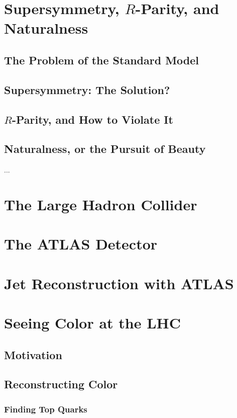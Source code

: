 \documentclass{report}
\begin{document}
\chapter{Supersymmetry, $R$-Parity, and Naturalness}
\section{The Problem of the Standard Model}
\section{Supersymmetry: The Solution?}
\section{$R$-Parity, and How to Violate It}
\section{Naturalness, or the Pursuit of Beauty}
		 ...


\chapter{The Large Hadron Collider}

		

\chapter{The ATLAS Detector}



\chapter{Jet Reconstruction with ATLAS}


\chapter{Seeing Color at the LHC}
\section{Motivation}
\section{Reconstructing Color}
	\subsection{Finding Top Quarks}
\end{document}
